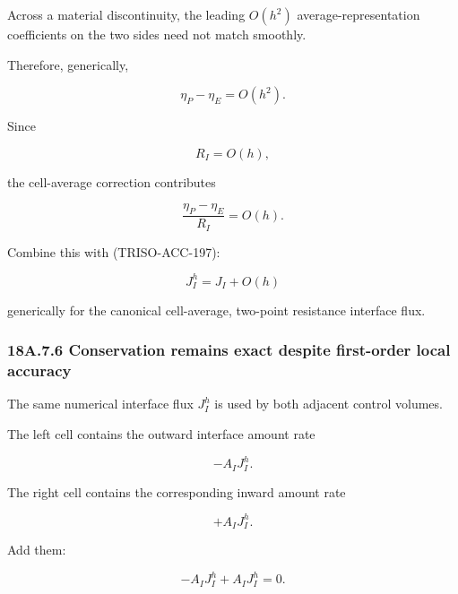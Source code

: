 \documentclass[11pt,a4paper]{article}
\begin{document}
Across a material discontinuity, the leading $O(h^2)$ average-representation coefficients on the two sides need not match smoothly.

Therefore, generically,

\begin{equation}
\eta_P-\eta_E=O(h^2).
\tag{TRISO-ACC-207}
\label{eq:triso-acc-207}
\end{equation}

Since

\begin{equation}
R_I=O(h),
\tag{TRISO-ACC-208}
\label{eq:triso-acc-208}
\end{equation}

the cell-average correction contributes

\begin{equation}
\frac{\eta_P-\eta_E}{R_I}
=
O(h).
\tag{TRISO-ACC-209}
\label{eq:triso-acc-209}
\end{equation}

Combine this with (TRISO-ACC-197):

\begin{equation}
\boxed{
J_I^h
=
J_I
+
O(h)
}
\tag{TRISO-ACC-210}
\label{eq:triso-acc-210}
\end{equation}

generically for the canonical cell-average, two-point resistance interface flux.

\subsubsection*{18A.7.6 Conservation remains exact despite first-order local accuracy}

The same numerical interface flux $J_I^h$ is used by both adjacent control volumes.

The left cell contains the outward interface amount rate

\begin{equation}
-A_IJ_I^h.
\tag{TRISO-ACC-211}
\label{eq:triso-acc-211}
\end{equation}

The right cell contains the corresponding inward amount rate

\begin{equation}
+A_IJ_I^h.
\tag{TRISO-ACC-212}
\label{eq:triso-acc-212}
\end{equation}

Add them:

\begin{equation}
-A_IJ_I^h+A_IJ_I^h=0.
\tag{TRISO-ACC-213}
\label{eq:triso-acc-213}
\end{equation}
\end{document}
